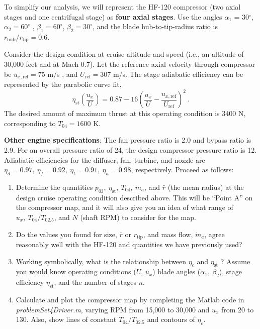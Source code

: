 \documentclass[11pt]{article}
\begin{document}
    To simplify our analysis, we will represent the HF-120 compressor (two axial stages and one centrifugal stage) as \textbf{four axial stages}. Use the angles $\alpha_1$ = 30$^\circ$, $\alpha_2=60^\circ$ , $\beta_1=60^\circ$, $\beta_2 =30^\circ$, and the blade hub-to-tip-radius ratio is $r_\mathrm{hub}/r_\mathrm{tip}=0.6$.
    
	Consider the design condition at cruise altitude and speed (i.e., an altitude of 30,000 feet and at Mach 0.7). Let the reference axial velocity through compressor be $u_{x,\mathrm{ref}}=75$ m/s , and $U_\mathrm{ref}=307$ m/s. The stage adiabatic efficiency can be represented by the parabolic curve fit, 
    \begin{equation}
    	\eta_\mathrm{st}\left(\frac{u_x}{U}\right)=0.87-16\left(
        \frac{u_x}{U}-\frac{u_{x,\mathrm{ref}}}{U_\mathrm{ref}}\right)^2\ .
    \end{equation}
    The desired amount of maximum thrust at this operating condition is 3400 N, corresponding to $T_{04}=1600$ K.
    
    \textbf{Other engine specifications}: The fan pressure ratio is 2.0 and bypass ratio is 2.9. For an overall pressure ratio of 24, the design compressor pressure ratio is 12. Adiabatic efficiencies for the diffuser, fan, turbine, and nozzle are $\eta_d = 0.97 ,\ \eta_f = 0.92 ,\ \eta_t = 0.91 ,\ \eta_n = 0.98$, respectively.
Proceed as follows:
	\begin{enumerate}[label=(\alph*)]
    	\item
        	Determine the quantities $p_{03},\ \eta_\mathrm{st},\ T_{04},\ \dot{m}_a$, and $\bar{r}$ (the mean radius) at the design cruise operating condition described above. This will be ``Point A'' on the compressor map, and it will also give you an idea of what range of $u_x,\ T_{04}/ T_{02.5}$, and $N$ (shaft RPM) to consider for the map.
        \item
        	Do the values you found for size, $\bar{r}$ or $r_\mathrm{tip}$, and mass flow, $\dot{m}_a$, agree reasonably well with the HF-120 and quantities we have previously used?
         \item
         	Working symbolically, what is the relationship between $\eta_c$ and $\eta_\mathrm{st}$ ? Assume you would know operating conditions ($U$, $u_x$) blade angles ($\alpha_1,\ \beta_2$), stage efficiency $\eta_\mathrm{st}$, and the
number of stages $n$.
		\item
        	Calculate and plot the compressor map by completing the Matlab code in \emph{problemSet4Driver.m}, varying RPM from 15,000 to 30,000 and $u_x$ from 20 to 130. Also, show lines of constant $T_{04}/T_{02.5}$ and contours of $\eta_c$.
    \end{enumerate}
\end{document}
